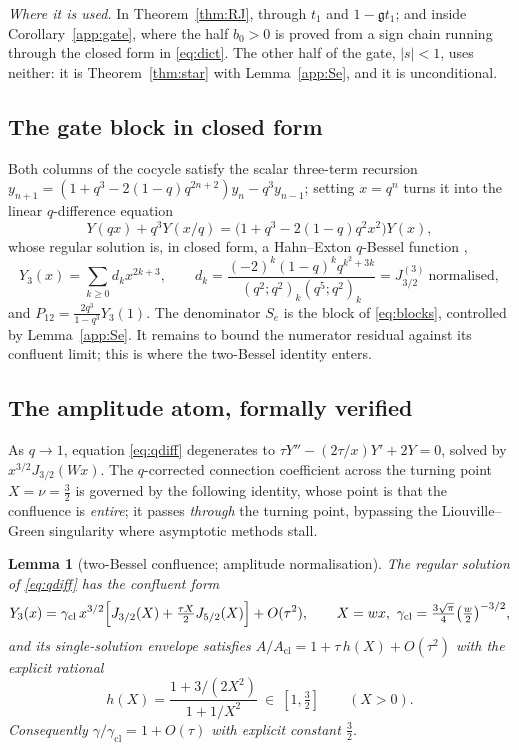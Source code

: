 \documentclass[11pt]{article}
\theoremstyle{plain}
\newtheorem{lemma}[theorem]{Lemma}
\theoremstyle{definition}
\theoremstyle{remark}
\begin{document}
\emph{Where it is used.} In Theorem~\ref{thm:RJ}, through $t_1$ and $1-\mathfrak gt_1$; and inside
Corollary~\ref{app:gate}, where the half $b_0>0$ is proved from a sign chain running through the
closed form in \eqref{eq:dict}. The other half of the gate, $|s|<1$, uses neither: it is
Theorem~\ref{thm:star} with Lemma~\ref{app:Se}, and it is unconditional.

\subsection{The gate block in closed form}\label{sec:gateblock}

Both columns of the cocycle satisfy the scalar three-term recursion
$y_{n+1}=(1+q^3-2(1-q)q^{2n+2})y_n-q^3y_{n-1}$; setting $x=q^n$ turns it into the linear
$q$-difference equation
\begin{equation}\label{eq:qdiff}
  Y(qx)+q^3Y(x/q)=\bigl(1+q^3-2(1-q)q^2x^2\bigr)Y(x),
\end{equation}
whose regular solution is, in closed form, a Hahn--Exton $q$-Bessel function
\cite{Hahn1953,Exton1978,KS1992},
\begin{equation}\label{eq:p12closed}
  Y_3(x)=\sum_{k\ge0}d_kx^{2k+3},\qquad
  d_k=\frac{(-2)^k(1-q)^kq^{k^2+3k}}{(q^2;q^2)_k(q^5;q^2)_k}=J^{(3)}_{3/2}\ \text{normalised},
\end{equation}
and $P_{12}=\tfrac{2q^3}{1-q^3}Y_3(1)$. The denominator $S_e$ is the block of \eqref{eq:blocks},
controlled by Lemma~\ref{app:Se}. It remains to bound the numerator residual against its confluent
limit; this is where the two-Bessel identity enters.

\subsection{The amplitude atom, formally verified}

As $q\to1$, equation \eqref{eq:qdiff} degenerates to $\tau Y''-(2\tau/x)Y'+2Y=0$, solved by
$x^{3/2}J_{3/2}(Wx)$. The $q$-corrected connection coefficient across the turning point $X=\nu=\tfrac32$
is governed by the following identity, whose point is that the confluence is \emph{entire}; it
passes \emph{through} the turning point, bypassing the Liouville--Green singularity where asymptotic
methods stall.

\begin{lemma}[two-Bessel confluence; amplitude normalisation]\label{lem:atomN}
The regular solution of \eqref{eq:qdiff} has the confluent form
\[
   Y_3(x)=\gamma_{\mathrm{cl}}\,x^{3/2}\Bigl[J_{3/2}(X)+\tfrac{\tau X}2J_{5/2}(X)\Bigr]+O(\tau^2),
   \qquad X=wx,\ \gamma_{\mathrm{cl}}=\tfrac{3\sqrt\pi}4\bigl(\tfrac w2\bigr)^{-3/2},
\]
and its single-solution envelope satisfies $A/A_{\mathrm{cl}}=1+\tau\,h(X)+O(\tau^2)$ with the
\emph{explicit rational}
\[
   h(X)=\frac{1+3/(2X^2)}{1+1/X^2}\ \in\ [1,\tfrac32]\qquad(X>0).
\]
Consequently $\gamma/\gamma_{\mathrm{cl}}=1+O(\tau)$ with explicit constant $\tfrac32$.
\end{lemma}
\end{document}
